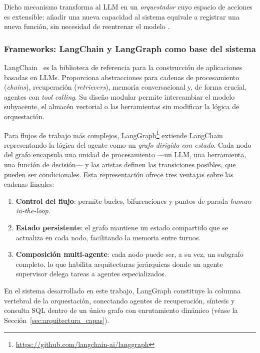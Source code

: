 Dicho mecanismo transforma al \ac{LLM} en un \emph{orquestador} cuyo espacio de acciones es extensible: añadir una nueva capacidad al sistema equivale a registrar una nueva función, sin necesidad de reentrenar el modelo \parencite{Plaat2025AgenticSurvey}.

\subsubsection{Frameworks: LangChain y LangGraph como base del sistema}

LangChain~\parencite{chase2022langchain} es la biblioteca de referencia para la construcción de aplicaciones basadas en \ac{LLM}s. Proporciona abstracciones para cadenas de procesamiento (\emph{chains}), recuperación (\emph{retrievers}), memoria conversacional y, de forma crucial, agentes con \emph{tool calling}. Su diseño modular permite intercambiar el modelo subyacente, el almacén vectorial o las herramientas sin modificar la lógica de orquestación.

Para flujos de trabajo más complejos, LangGraph\footnote{\url{https://github.com/langchain-ai/langgraph}} extiende LangChain representando la lógica del agente como un \emph{grafo dirigido con estado}. Cada nodo del grafo encapsula una unidad de procesamiento ---un \ac{LLM}, una herramienta, una función de decisión--- y las aristas definen las transiciones posibles, que pueden ser condicionales. Esta representación ofrece tres ventajas sobre las cadenas lineales:

\begin{enumerate}[nosep, leftmargin=*]
    \item \textbf{Control del flujo}: permite bucles, bifurcaciones y puntos de parada \emph{human-in-the-loop}.
    \item \textbf{Estado persistente}: el grafo mantiene un estado compartido que se actualiza en cada nodo, facilitando la memoria entre turnos.
    \item \textbf{Composición multi-agente}: cada nodo puede ser, a su vez, un subgrafo completo, lo que habilita arquitecturas jerárquicas donde un agente supervisor delega tareas a agentes especializados.
\end{enumerate}

En el sistema desarrollado en este trabajo, LangGraph constituye la columna vertebral de la orquestación, conectando agentes de recuperación, síntesis y consulta \ac{SQL} dentro de un único grafo con enrutamiento dinámico (véase la Sección~\ref{sec:arquitectura_capas}).

